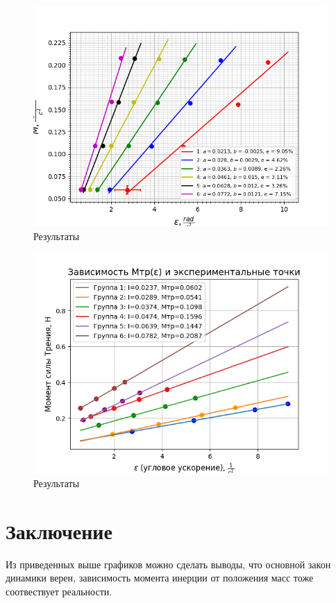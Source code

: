 \documentclass[a4paper]{article}
\begin{document}
\begin{figure}[H]
\begin{center}
	\includegraphics[scale=0.5]{lgnt_g.png}
	\caption{Результаты}
\end{center}
\end{figure}
\begin{figure}[H]
\begin{center}
	\includegraphics[scale=0.5]{nig.png}
	\caption{Результаты}
\end{center}
\end{figure}


\section{Заключение}
Из приведенных выше графиков можно сделать выводы, что основной закон динамики верен, зависимость момента инерции от положения масс тоже соотвествует реальности.\\
\end{document}
